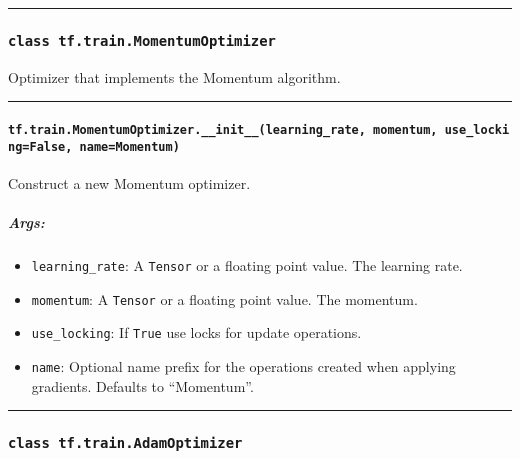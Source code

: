 \begin{center}\rule{0.5\linewidth}{\linethickness}\end{center}

\subsubsection{\texorpdfstring{\texttt{class\ tf.train.MomentumOptimizer}
}{class tf.train.MomentumOptimizer }}\label{class-tf.train.momentumoptimizer}

Optimizer that implements the Momentum algorithm.

\begin{center}\rule{0.5\linewidth}{\linethickness}\end{center}

\paragraph{\texorpdfstring{\texttt{tf.train.MomentumOptimizer.\_\_init\_\_(learning\_rate,\ momentum,\ use\_locking=False,\ name=\textquotesingle{}Momentum\textquotesingle{})}
}{tf.train.MomentumOptimizer.\_\_init\_\_(learning\_rate, momentum, use\_locking=False, name='Momentum') }}\label{tf.train.momentumoptimizer.ux5fux5finitux5fux5flearningux5frate-momentum-useux5flockingfalse-namemomentum}

Construct a new Momentum optimizer.

\subparagraph{Args: }\label{args-7}

\begin{itemize}
\tightlist
\item
  \texttt{learning\_rate}: A \texttt{Tensor} or a floating point value.
  The learning rate.
\item
  \texttt{momentum}: A \texttt{Tensor} or a floating point value. The
  momentum.
\item
  \texttt{use\_locking}: If \texttt{True} use locks for update
  operations.
\item
  \texttt{name}: Optional name prefix for the operations created when
  applying gradients. Defaults to ``Momentum''.
\end{itemize}

\begin{center}\rule{0.5\linewidth}{\linethickness}\end{center}

\subsubsection{\texorpdfstring{\texttt{class\ tf.train.AdamOptimizer}
}{class tf.train.AdamOptimizer }}\label{class-tf.train.adamoptimizer}

